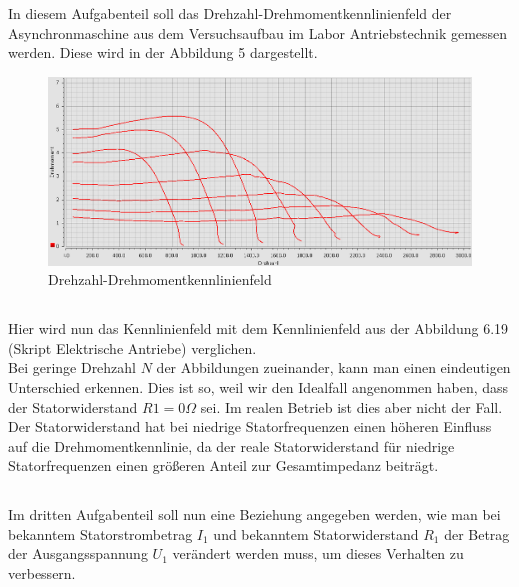 \chapter{}
\section{}
In diesem Aufgabenteil soll das Drehzahl-Drehmomentkennlinienfeld der Asynchronmaschine aus dem Versuchsaufbau im Labor Antriebstechnik gemessen werden. Diese wird in der Abbildung 5 dargestellt.
\begin{figure}[h]
	\centering
	\includegraphics[width=\textwidth]{./Bilder/ele3.png}
	\caption{Drehzahl-Drehmomentkennlinienfeld}
	\label{fig:7a}
\end{figure}

\section{}
Hier wird nun das Kennlinienfeld mit dem Kennlinienfeld aus der Abbildung 6.19 (Skript Elektrische Antriebe) verglichen.\\
Bei geringe Drehzahl $ N $ der Abbildungen zueinander, kann man einen eindeutigen Unterschied erkennen. Dies ist so, weil wir den Idealfall angenommen haben, dass der Statorwiderstand $ R1 = 0\Omega $ sei. Im realen Betrieb ist dies aber nicht der Fall. Der Statorwiderstand hat bei niedrige Statorfrequenzen einen höheren Einfluss auf die Drehmomentkennlinie, da der reale Statorwiderstand für niedrige Statorfrequenzen einen größeren Anteil zur Gesamtimpedanz beiträgt.

\section{}
Im dritten Aufgabenteil soll nun eine Beziehung angegeben werden, wie man bei bekanntem Statorstrombetrag $ I_{1} $ und bekanntem Statorwiderstand $ R_{1} $ der Betrag der Ausgangsspannung $ U_{1} $ verändert werden muss, um dieses Verhalten zu verbessern.

